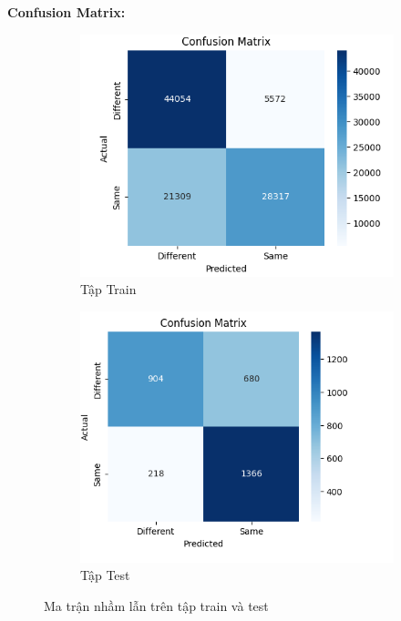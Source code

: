{\vspace{0.5em}
\noindent
\textbf{Confusion Matrix:}

\begin{figure}[H]
    \centering
    \begin{subfigure}[b]{0.48\textwidth}
        \centering
        \includegraphics[width=\textwidth]{img/05-Train.png}
        \caption{Tập Train}
    \end{subfigure}
    \hfill
    \begin{subfigure}[b]{0.48\textwidth}
        \centering
        \includegraphics[width=\textwidth]{img/05-Test.png}
        \caption{Tập Test}
    \end{subfigure}
    \caption{Ma trận nhầm lẫn trên tập train và test}
\end{figure}

}
